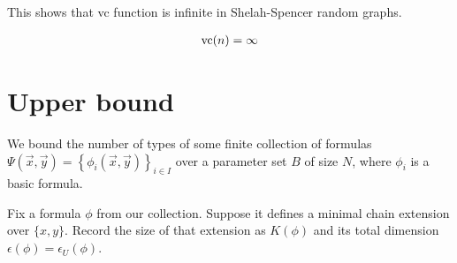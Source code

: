 \documentclass{amsart}
\newcommand{\curly}[1]{\left\{#1\right\}}
\begin{document}
This shows that vc function is infinite in Shelah-Spencer random graphs.

\begin{align*}
	\operatorname{vc}(n) = \infty
\end{align*}

\section{Upper bound}





%




We bound the number of types of some finite collection of formulas $\Psi(\vec x, \vec y) = \curly{\phi_i(\vec x, \vec y)}_{i\in I}$ over a parameter set $B$ of size $N$,
where $\phi_i$ is a basic formula.

Fix a formula $\phi$ from our collection.
Suppose it defines a minimal chain extension over $\{x, y\}$. 
Record the size of that extension as $K(\phi)$ and its total dimension $\epsilon(\phi) = \epsilon_U(\phi)$.
\end{document}
